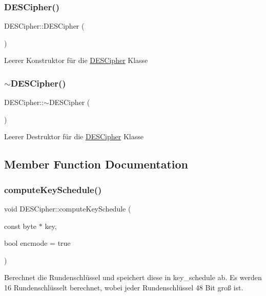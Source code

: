 \subsubsection{\texorpdfstring{D\+E\+S\+Cipher()}{DESCipher()}}
{\footnotesize\ttfamily D\+E\+S\+Cipher\+::\+D\+E\+S\+Cipher (\begin{DoxyParamCaption}{ }\end{DoxyParamCaption})}

Leerer Konstruktor für die \hyperlink{classDESCipher}{D\+E\+S\+Cipher} Klasse \mbox{\label{classDESCipher_ab2a6522ce5c469bfb055e1005ca03fbf}} 
\subsubsection{\texorpdfstring{$\sim$\+D\+E\+S\+Cipher()}{~DESCipher()}}
{\footnotesize\ttfamily D\+E\+S\+Cipher\+::$\sim$\+D\+E\+S\+Cipher (\begin{DoxyParamCaption}{ }\end{DoxyParamCaption})}

Leerer Destruktor für die \hyperlink{classDESCipher}{D\+E\+S\+Cipher} Klasse 

\subsection{Member Function Documentation}
\mbox{\label{classDESCipher_a7dc960554f1e80092e62730769b9220b}} 
\subsubsection{\texorpdfstring{compute\+Key\+Schedule()}{computeKeySchedule()}}
{\footnotesize\ttfamily void D\+E\+S\+Cipher\+::compute\+Key\+Schedule (\begin{DoxyParamCaption}\item[{const byte $\ast$}]{key,  }\item[{bool}]{encmode = {\ttfamily true} }\end{DoxyParamCaption})}

Berechnet die Rundenschlüssel und speichert diese in key\+\_\+schedule ab. Es werden 16 Rundenschlüsselt berechnet, wobei jeder Rundenschlüssel 48 Bit groß ist.


